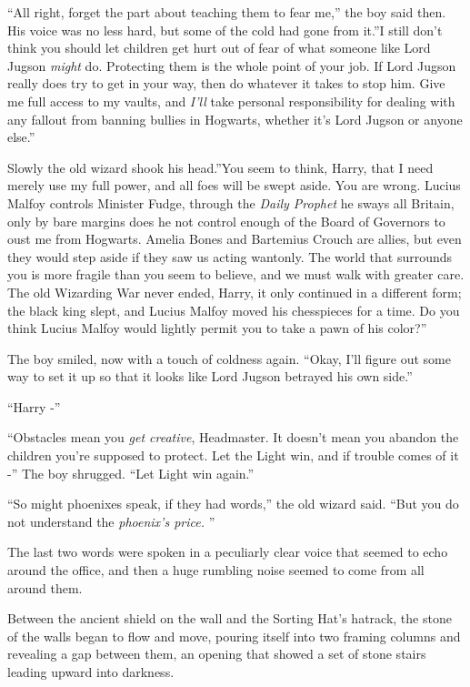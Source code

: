 ``All right, forget the part about teaching them to fear me,'' the boy
said then. His voice was no less hard, but some of the cold had gone
from it.''I still don't think you should let children get hurt out of
fear of what someone like Lord Jugson \emph{might} do. Protecting them
is the whole point of your job. If Lord Jugson really does try to get in
your way, then do whatever it takes to stop him. Give me full access to
my vaults, and \emph{I'll} take personal responsibility for dealing with
any fallout from banning bullies in Hogwarts, whether it's Lord Jugson
or anyone else.''

Slowly the old wizard shook his head.''You seem to think, Harry, that I
need merely use my full power, and all foes will be swept aside. You are
wrong. Lucius Malfoy controls Minister Fudge, through the \emph{Daily
Prophet} he sways all Britain, only by bare margins does he not control
enough of the Board of Governors to oust me from Hogwarts. Amelia Bones
and Bartemius Crouch are allies, but even they would step aside if they
saw us acting wantonly. The world that surrounds you is more fragile
than you seem to believe, and we must walk with greater care. The old
Wizarding War never ended, Harry, it only continued in a different form;
the black king slept, and Lucius Malfoy moved his chesspieces for a
time. Do you think Lucius Malfoy would lightly permit you to take a pawn
of his color?''

The boy smiled, now with a touch of coldness again. ``Okay, I'll figure
out some way to set it up so that it looks like Lord Jugson betrayed his
own side.''

``Harry -''

``Obstacles mean you \emph{get creative}, Headmaster. It doesn't mean you
abandon the children you're supposed to protect. Let the Light win, and
if trouble comes of it -'' The boy shrugged. ``Let Light win again.''

``So might phoenixes speak, if they had words,'' the old wizard said.
``But you do not understand the \emph{phoenix's price.} ''

The last two words were spoken in a peculiarly clear voice that seemed
to echo around the office, and then a huge rumbling noise seemed to come
from all around them.

Between the ancient shield on the wall and the Sorting Hat's hatrack,
the stone of the walls began to flow and move, pouring itself into two
framing columns and revealing a gap between them, an opening that showed
a set of stone stairs leading upward into darkness.

